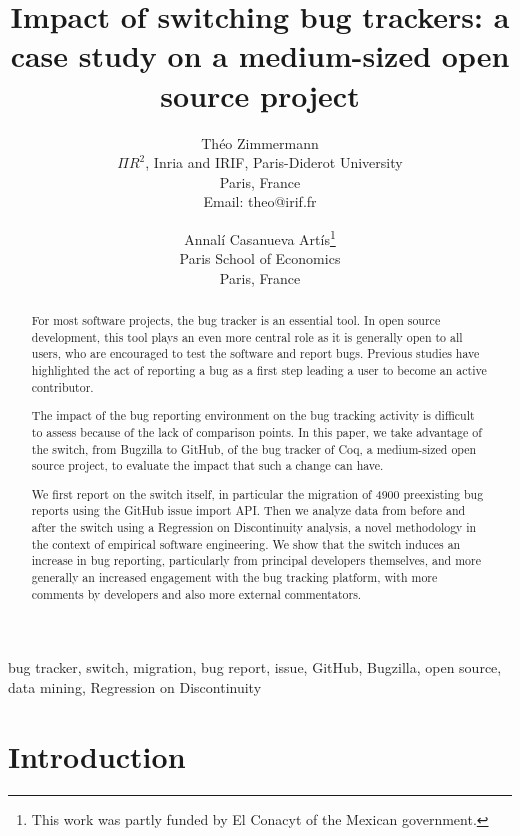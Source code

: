 \documentclass[conference]{IEEEtran}
\begin{document}
%
\title{Impact of switching bug trackers: a case study on a medium-sized open source project}
%
\author{Th\'eo Zimmermann\\
$\Pi R^2$, Inria and
IRIF, Paris-Diderot University\\
Paris, France\\
Email: theo@irif.fr
\and
Annal\'i Casanueva Art\'is\thanks{This work was partly funded by El Conacyt of the Mexican government.}\\
Paris School of Economics\\
Paris, France}
%
\maketitle
%
\begin{abstract}
For most software projects, the bug tracker is an essential tool. In open source development, this tool plays an even more central role as it is generally open to all users, who are encouraged to test the software and report bugs. Previous studies have highlighted the act of reporting a bug as a first step leading a user to become an active contributor.

The impact of the bug reporting environment on the bug tracking activity is difficult to assess because of the lack of comparison points. In this paper, we take advantage of the switch, from Bugzilla to GitHub, of the bug tracker of Coq, a medium-sized open source project, to evaluate the impact that such a change can have.

We first report on the switch itself, in particular the migration of 4900 preexisting bug reports using the GitHub issue import API. Then we analyze data from before and after the switch using a Regression on Discontinuity analysis, a novel methodology in the context of empirical software engineering.
We show that the switch induces an increase in bug reporting, particularly from principal developers themselves, and more generally an increased engagement with the bug tracking platform, with more comments by developers and also more external commentators.
\end{abstract}


\begin{IEEEkeywords}
bug tracker, switch, migration, bug report, issue, GitHub, Bugzilla, open source, data mining, Regression on Discontinuity
\end{IEEEkeywords}
%
%
%
\section{Introduction}
\end{document}
